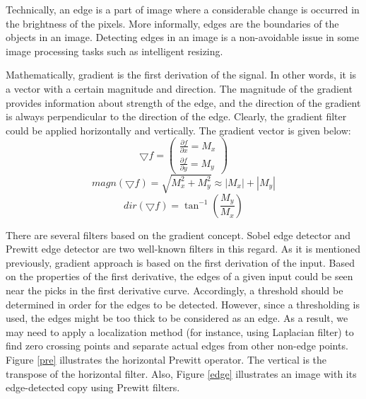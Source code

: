 \documentclass{article}
\begin{document}
			Technically, an edge is a part of image where a considerable change is occurred in the brightness of the pixels.
			More informally, edges are the boundaries of
			the objects in an image. Detecting edges in an image is a non-avoidable issue in some image processing tasks such as intelligent resizing.
			
			Mathematically, gradient is the first derivation of the signal. In other words, it is a vector with a certain magnitude and direction. 
			The magnitude of the gradient provides information about strength
			of the edge, and the direction of the gradient is always perpendicular to the direction of the edge. Clearly, the gradient filter could be
			applied horizontally and vertically. The gradient vector is given below:
\begin{equation}
  \bigtriangledown f = \begin{pmatrix}
\frac{\partial f}{\partial x} = M_x\\ 
\frac{\partial f}{\partial y} = M_y
\end{pmatrix}
\end{equation}
\begin{equation}
magn(\bigtriangledown f) = \sqrt{M_x^{2}+M_y^{2}}\approx \left | M_x \right |+\left | M_y \right |
\end{equation}
\begin{equation}
dir(\bigtriangledown f) = \tan^{-1}(\frac{M_y}{M_x})
\end{equation}



			There are several filters based on the gradient concept. Sobel edge detector and Prewitt edge detector are two well-known filters in this regard.
			As it is mentioned previously, gradient approach is based on the first derivation of the input. Based on the properties of
			the first derivative, the edges of a given input could be seen near the picks in the first derivative curve. Accordingly, a threshold should be
			determined in order for the edges to be detected. However, since a thresholding is used, the edges might be too thick to be considered
			as an edge. As a result, we may need to apply a localization method (for instance, using Laplacian filter) to find zero
			crossing points and separate actual edges from other non-edge points. Figure \ref{pre}  illustrates the horizontal Prewitt operator. The vertical is the transpose of the horizontal filter. Also, Figure \ref{edge} illustrates an image with its edge-detected copy using Prewitt filters.
\end{document}
